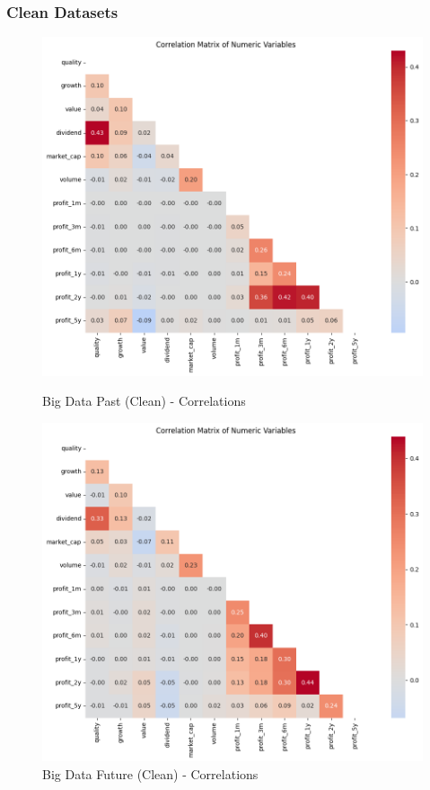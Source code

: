 \documentclass[11pt,english,a4paper,hidelinks]{book}
\begin{document}
\subsubsection{Clean Datasets}
\begin{figure}[H]
    \centering
    \begin{minipage}{0.48\textwidth}
        \centering
        \includegraphics[width=\linewidth]{images/code/descriptive analysis/correlations/Big Data Past.png}
        \caption{Big Data Past (Clean) - Correlations}
        \label{fig:big_data_past_correlations}
    \end{minipage}\hfill
    \begin{minipage}{0.48\textwidth}
        \centering
        \includegraphics[width=\linewidth]{images/code/descriptive analysis/correlations/Big Data future.png}
        \caption{Big Data Future (Clean) - Correlations}
        \label{fig:big_data_future_correlations}
    \end{minipage}
\end{figure}
\end{document}
